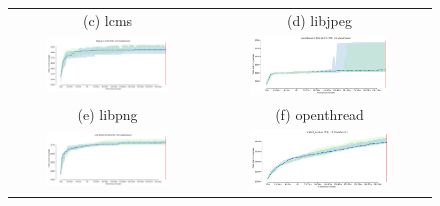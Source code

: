 \begin{figure}[t]
{\begin{tabular}{cc}
            (c) lcms                                                                                                       & (d) libjpeg                                                                                                          \\[6pt]
            \includegraphics[width=0.65\textwidth]{assets/fuzzbench/symptr-25-vs-35-2/libpng-1.2.56_coverage_growth.png}   & \includegraphics[width=0.65\textwidth]{assets/fuzzbench/symptr-25-vs-35-2/openthread-2019-12-23_coverage_growth.png} \\
            (e) libpng                                                                                                     & (f) openthread                                                                                                       \\[6pt]
            \includegraphics[width=0.65\textwidth]{assets/fuzzbench/symptr-25-vs-35-2/re2-2014-12-09_coverage_growth.png}  & \includegraphics[width=0.65\textwidth]{assets/fuzzbench/symptr-25-vs-35-2/sqlite3_ossfuzz_coverage_growth.png}       \\

\end{tabular}}
\end{figure}

